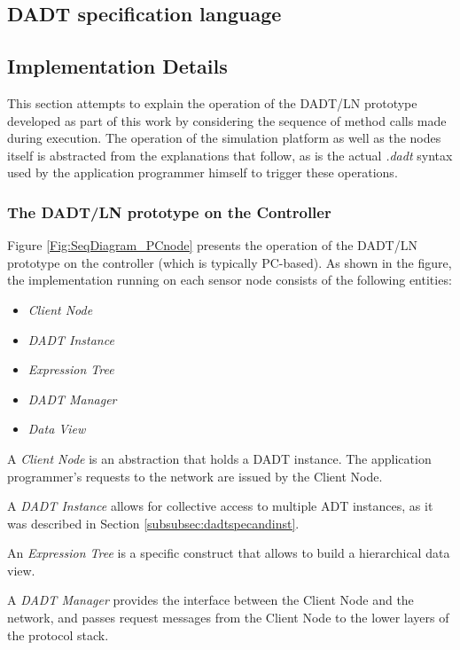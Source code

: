 \subsection{DADT specification language} \label{subsec:DADTlanguage}
 

\subsection{Implementation Details}

This section attempts to explain the operation of the DADT/LN prototype
developed as part of this work by considering the sequence of method calls made
during execution. The operation of the simulation platform as well as the
nodes itself is abstracted from the explanations that follow, as is the actual
\emph{.dadt} syntax used by the application programmer himself to trigger these
operations. 

\subsubsection{The DADT/LN prototype on the Controller}

Figure \ref{Fig:SeqDiagram_PCnode} presents the operation of the DADT/LN
prototype on the controller (which is typically PC-based). As shown in the figure, the implementation running on each sensor node 
consists of the following entities:

\begin{itemize}
  \item \emph{Client Node}
  \item \emph{DADT Instance}
  \item \emph{Expression Tree} 
  \item \emph{DADT Manager} 
  \item \emph{Data View} 
\end{itemize}

A \emph{Client Node} is an abstraction that holds a DADT
instance. The application programmer's requests to the network are issued
by the Client Node.
  
A \emph{DADT Instance} allows for collective access to multiple ADT instances,
as it was described in Section \ref{subsubsec:dadtspecandinst}.

An \emph{Expression Tree} is a specific construct that allows to build a
hierarchical data view.

A \emph{DADT Manager} provides the interface between the Client Node and the
network, and passes request messages from the Client Node to the lower layers
of the protocol stack.

